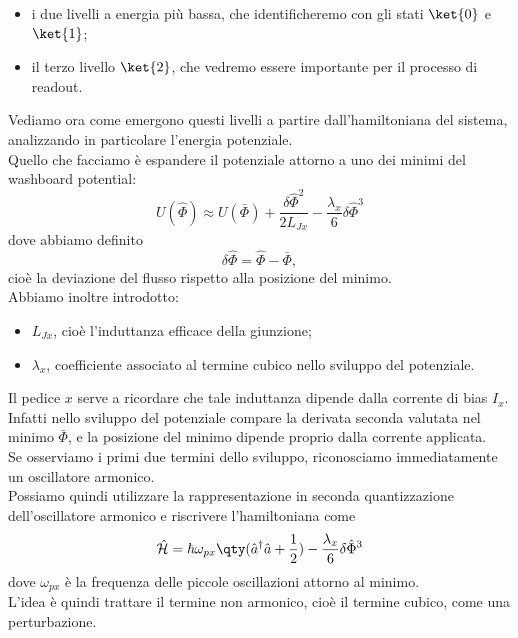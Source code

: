 \begin{itemize}[leftmargin=0.5cm]
    \item i due livelli a energia più bassa, che identificheremo con gli stati $\ket{0}$ e $\ket{1}$;
    \item il terzo livello $\ket{2}$, che vedremo essere importante per il processo di readout.
\end{itemize}
Vediamo ora come emergono questi livelli a partire dall'hamiltoniana del sistema, analizzando in particolare l'energia potenziale.\\
Quello che facciamo è espandere il potenziale attorno a uno dei minimi del washboard potential:
\begin{equation*}
    U(\hat{\Phi})
    \approx
    U(\bar{\Phi})
    +
    \frac{\delta\hat{\Phi}^2}{2L_{Jx}}
    -
    \frac{\lambda_x}{6}
    \delta\hat{\Phi}^3
\end{equation*}
dove abbiamo definito
\[
\delta\hat{\Phi}
=
\hat{\Phi}-\bar{\Phi},
\]
cioè la deviazione del flusso rispetto alla posizione del minimo.\\
Abbiamo inoltre introdotto:
\begin{itemize}[leftmargin=0.5cm]
    \item $L_{Jx}$, cioè l'induttanza efficace della giunzione;
    \item $\lambda_x$, coefficiente associato al termine cubico nello sviluppo del potenziale.
\end{itemize}
Il pedice $x$ serve a ricordare che tale induttanza dipende dalla corrente di bias $I_x$. Infatti nello sviluppo del potenziale compare la derivata seconda valutata nel minimo $\bar{\Phi}$, e la posizione del minimo dipende proprio dalla corrente applicata.\\
Se osserviamo i primi due termini dello sviluppo, riconosciamo immediatamente un oscillatore armonico.\\
Possiamo quindi utilizzare la rappresentazione in seconda quantizzazione dell'oscillatore armonico e riscrivere l'hamiltoniana come
\begin{equation*}
    \hat{\mathcal{H}}
    =
    \hbar\omega_{px}
    \qty(
        \hat{a}^\dagger\hat{a}
        +
        \frac{1}{2}
    )
    -
    \frac{\lambda_x}{6}
    \delta\hat{\Phi}^3
\end{equation*}
dove $\omega_{px}$ è la frequenza delle piccole oscillazioni attorno al minimo.\\
L'idea è quindi trattare il termine non armonico, cioè il termine cubico, come una perturbazione.\\
